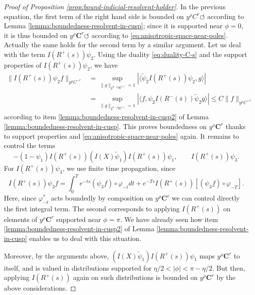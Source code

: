 \documentclass[10pt]{amsart}
\newcommand{\bC}{\boldsymbol{C}}
\theoremstyle{plain}
\theoremstyle{definition}
\begin{document}
\begin{proof}[Proof of Proposition \ref{prop:bound-indicial-resolvent-holder}]
In the previous equation, the first term of the right hand side is bounded on $y^\rho C^r \circlearrowleft$ according to Lemma \ref{lemma:boundedness-resolvent-in-cusp}; since it is supported near $\phi=0$, it is thus bounded on $y^\rho \bC^r \circlearrowleft$ according to \eqref{eq:anisotropic-space-near-poles}. Actually the same holds for the second term by a similar argument. Let us deal with the term $I(R^+(s)) \psi_2$. Using the duality \eqref{eq:duality-C-s} and the support properties of $I(R^+(s)) \psi_2$, we have\vspace*{-3pt}
\[
\begin{split}
\| I(R^+(s)) \psi_2 f \|_{y^{\rho}C^{-r}} & = \sup_{\|g\|_{y^{d-\rho}W^{r,1}}=1} |\langle \tilde{\psi}_2 I(R^+(s)) \psi_2, g \rangle| \\[-3pt]
& = \sup_{\|g\|_{y^{d-\rho}W^{r,1}}=1} |\langle f, \psi_2 I(R^-(\bar{s})) \tilde{\psi}_2 g \rangle| \leq C \|f\|_{y^{\rho}C^{-r}}
\end{split}
\]
according to item \eqref{lemma:boundedness-resolvent-in-cusp2} of Lemma \ref{lemma:boundedness-resolvent-in-cusp}. This proves boundedness on $y^\rho \bC^r$ thanks to support properties and \eqref{eq:anisotropic-space-near-poles} again. It remains to control the terms\vspace*{-3pt}
\[
-(1-\psi_1) I(R^+(s)) (I(X) \widetilde{\psi}_1) I(R^+(s))\psi_1, \qquad I(R^+(s))\psi_3.
\]
For $I(R^+(s))\psi_3$, we use finite time propagation, since\vspace*{-3pt}\enlargethispage{\baselineskip}
\[
I(R^+(s))\psi_3 f = \int_0^T e^{-t s} (\psi_3 f)\circ\varphi_{-t} dt + e^{-Ts}I(R^+(s))[(\psi_3 f) \circ \varphi_{-T}].
\]
Here, since $\varphi_{-t}^*$ acts boundedly by composition on $y^\rho \bC^r$ we can control directly the first integral term. The second corresponds to applying $I(R^+(s))$ on elements of $y^\rho\bC^r$ supported near $\phi =\pi$. We have already seen how item \eqref{lemma:boundedness-resolvent-in-cusp2} of Lemma \ref{lemma:boundedness-resolvent-in-cusp} enables us to deal with this situation.

Moreover, by the arguments above, $(I(X)\tilde{\psi}_1) I(R^+(s))\psi_1$ maps $y^\rho \bC^r$ to itself, and is valued in distributions supported for $\eta/2 <|\phi|< \pi - \eta/2$. But then, applying $I(R^+(s))$ again on such distributions is bounded on $y^\rho \bC^r$ by the above considerations.
\end{proof}
\end{document}
